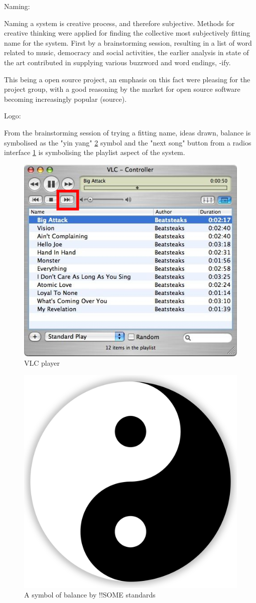 Naming:

Naming a system is creative process, and therefore subjective. Methods for creative thinking were applied for finding the collective most subjectively fitting name for the system. First by a brainstorming session, resulting in a list of word related to music, democracy and social activities, the earlier analysis in state of the art contributed in supplying various buzzword and word endings, -ify.

This being a open source project, an emphasis on this fact were pleasing for the project group, with a good reasoning by the market for open source software becoming increasingly popular (source).

Logo:

From the brainstorming session of trying a fitting name, ideas drawn, balance is symbolised as the "yin yang" \cref{fig:yinyang} symbol and the "next song" button from a radios interface \cref{fig:vlc} is symbolising the playlist aspect of the system.

\begin{figure}
  \centering
  \includegraphics[width=0.5\linewidth]{Images/vlc.jpg}
  \caption{VLC player}
  \label{fig:vlc}
\end{figure}

\begin{figure}
  \centering
  \includegraphics[width=0.5\linewidth]{Images/Yin-Yang.png}
  \caption{A symbol of balance by !!SOME standards}
  \label{fig:yinyang}
\end{figure}

